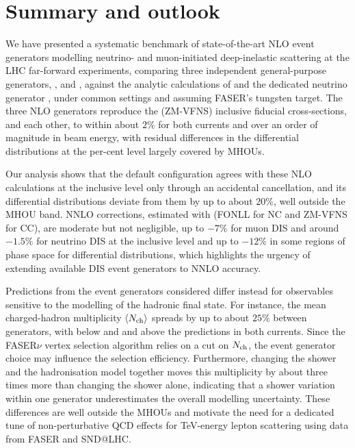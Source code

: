 \section{Summary and outlook}
\label{sec:conclusions}

We have presented a systematic benchmark of state-of-the-art NLO event generators modelling neutrino- and muon-initiated deep-inelastic scattering at the LHC far-forward experiments, comparing three independent general-purpose generators, \sherpa, \herwig and \powheg, against the analytic calculations of \yadism and the dedicated neutrino generator \genie, under common settings and assuming FASER's tungsten target.
%
The three NLO generators reproduce the \yadism (ZM-VFNS) inclusive fiducial cross-sections, and each other, to within about $2\%$ for both currents and over an order of magnitude in beam energy, with residual differences in the differential distributions at the per-cent level largely covered by MHOUs.

Our analysis shows that the default \genie configuration agrees with these NLO calculations at the inclusive level only through an accidental cancellation, and its differential distributions deviate from them by up to about $20\%$, well outside the MHOU band. 
%
NNLO corrections, estimated with \yadism (FONLL for NC and ZM-VFNS for CC), are moderate but not negligible, up to $-7\%$ for muon DIS and around $-1.5\%$ for neutrino DIS at the inclusive level and up to $-12\%$ in some regions of phase space for differential distributions, which highlights the urgency of extending available DIS event generators to NNLO accuracy.

Predictions from the event generators considered differ instead for observables sensitive to the modelling of the hadronic final state. 
%
For instance, the mean charged-hadron multiplicity $\left\langle N_{\rm ch}\right\rangle $ spreads by up to about $25\%$ between generators, with \genie below and \sherpa and \herwig above the \powheg predictions in both currents.
%
Since the FASER$\nu$ vertex selection algorithm relies on a cut on $N_{\rm ch}$, the event generator choice may influence the selection efficiency. 
%
Furthermore, changing the shower and the hadronisation model together moves this multiplicity by about three times more than changing the shower alone, indicating that a shower variation within one generator underestimates the overall modelling uncertainty.
%
These differences are well outside the MHOUs and motivate the need for a dedicated tune of non-perturbative QCD effects for TeV-energy lepton scattering using data from FASER and SND@LHC.

